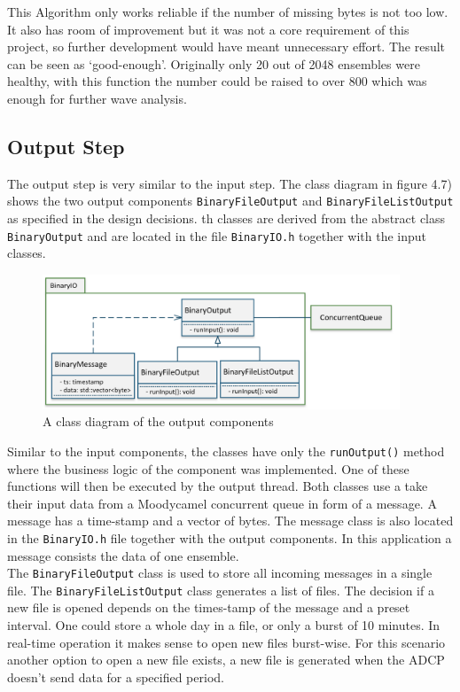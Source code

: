 This Algorithm only works reliable if the number of missing bytes is not too low. It also has room of improvement but it was not a core requirement of this project, so further development would have meant unnecessary effort. The result can be seen as `good-enough'. Originally only 20 out of 2048 ensembles were healthy, with this function the number could be raised to over 800 which was enough for further wave analysis.

\subsection{Output Step}
The output step is very similar to the input step. The class diagram in figure 4.7) shows the two output components \texttt{BinaryFileOutput} and \texttt{BinaryFileListOutput} as specified in the design decisions. th classes are derived from the abstract class \texttt{BinaryOutput} and are located in the file \texttt{BinaryIO.h} together with the input classes.

\begin{figure}[h]
\centering
      \includegraphics[width=0.95\textwidth]{output}
        \caption{A class diagram of the output components}
\end{figure}

Similar to the input components, the classes have only the \texttt{runOutput()} method where the business logic of the component was implemented. One of these functions will then be executed by the output thread. Both classes use a take their input data from a Moodycamel concurrent queue in form of a message. A message has a time-stamp and a vector of bytes. The message class is also located in the \texttt{BinaryIO.h} file together with the output components. In this application a message consists the data of one ensemble.\\ 
The \texttt{BinaryFileOutput} class is used to store all incoming messages in a single file. The \texttt{BinaryFileListOutput} class generates a list of files. The decision if a new file is opened depends on the times-tamp of the message and a preset interval. One could store a whole day in a file, or only a burst of 10 minutes. In real-time operation it makes sense to open new files burst-wise. For this scenario  another option to open a new file exists, a new file is generated when  the ADCP doesn't send data for a specified period.
